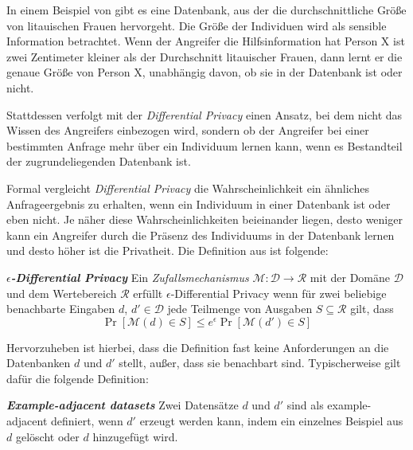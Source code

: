 In einem Beispiel von \citeauthor{dwork:2006} gibt es eine Datenbank, aus der die durchschnittliche Größe von litauischen Frauen hervorgeht. Die Größe der Individuen wird als sensible Information betrachtet. Wenn der Angreifer die Hilfsinformation hat \glqq{}Person X ist zwei Zentimeter kleiner als der Durchschnitt litauischer Frauen\grqq{}, dann lernt er die genaue Größe von Person X, unabhängig davon, ob sie in der Datenbank ist oder nicht. 

Stattdessen verfolgt \citeauthor{dwork:2006} mit der \textit{Differential Privacy} einen Ansatz, bei dem nicht das Wissen des Angreifers einbezogen wird, sondern ob der Angreifer bei einer bestimmten Anfrage mehr über ein Individuum lernen kann, wenn es Bestandteil der zugrundeliegenden Datenbank ist.

Formal vergleicht \textit{Differential Privacy} die Wahrscheinlichkeit ein ähnliches Anfrageergebnis zu erhalten, wenn ein Individuum in einer Datenbank ist oder eben nicht. Je näher diese Wahrscheinlichkeiten beieinander liegen, desto weniger kann ein Angreifer durch die Präsenz des Individuums in der Datenbank lernen und desto höher ist die Privatheit. Die Definition aus \cite{dwork:2006} ist folgende:

\begin{definition}\label{def:eps-differential-privacy}
	\emph{\textbf{$\epsilon$-Differential Privacy}} Ein \textit{Zufallsmechanismus} $\mathcal{M}: \mathcal{D} \rightarrow \mathcal{R}$ mit der Domäne $\mathcal{D}$ und dem Wertebereich $\mathcal{R}$ erfüllt $\epsilon$-Differential Privacy wenn für zwei beliebige benachbarte Eingaben $d$, $d' \in \mathcal{D}$ jede Teilmenge von Ausgaben $S \subseteq \mathcal{R}$ gilt, dass $$\Pr[\mathcal{M}(d) \in S] \leq e^{\epsilon} \Pr[\mathcal{M}(d') \in S]$$
\end{definition}

Hervorzuheben ist hierbei, dass die Definition fast keine Anforderungen an die Datenbanken $d$ und $d'$ stellt, außer, dass sie benachbart sind. Typischerweise gilt dafür die folgende Definition:
\begin{definition}\label{def:example-adjacency}
	\emph{\textbf{Example-adjacent datasets}} Zwei Datensätze $d$ und $d'$ sind als example-adjacent definiert, wenn $d'$ erzeugt werden kann, indem ein einzelnes Beispiel aus $d$ gelöscht oder $d$ hinzugefügt wird.
\end{definition}

